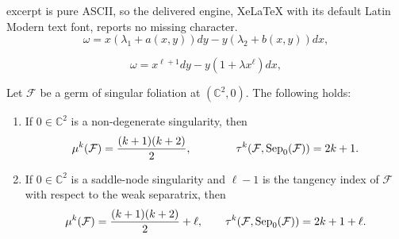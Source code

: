 \documentclass[10pt,a4paper]{amsart}
\newcommand{\C}{\mathbb{C}}
\newcommand{\F}{\mathcal{F}}
\newcommand{\sep}{\mbox{\rm Sep}}
\begin{document}
excerpt is pure ASCII, so the delivered engine, XeLaTeX with its default Latin Modern text font, reports no missing character.
\begin{equation}
\label{non-degenerate}
\omega=x(\lambda_1+a(x,y))dy-y(\lambda_2+b(x,y))dx,
\end{equation}

\begin{equation}
\label{saddle-node-formal}
\omega = x^{\ell+1} dy-y(1 + \lambda x^{\ell})dx,
\end{equation}

\begin{proposition}
Let $\F$ be a germ of singular foliation at $(\C^2,0)$. The following holds:  
\begin{enumerate}
    \item If $0\in\C^2$ is a non-degenerate singularity, then 
    \[\mu^{k}(\mathcal{F})= \frac{(k+1)(k+2)}{2},\qquad\qquad \tau^{k} (\mathcal{F}, \sep_0(\F))  = 2k + 1.\]
    \item If $0\in\C^2$ is a saddle-node singularity and $\ell-1$ is the tangency index of $\F$ with respect to the weak separatrix, then  \[\mu^{k}(\mathcal{F}) = \frac{(k+1)(k+2)}{2}  + \ell,\qquad \tau^{k} (\mathcal{F}, \sep_0(\F)) =  2k + 1 + \ell.\]
\end{enumerate}

\end{proposition}
\end{document}
